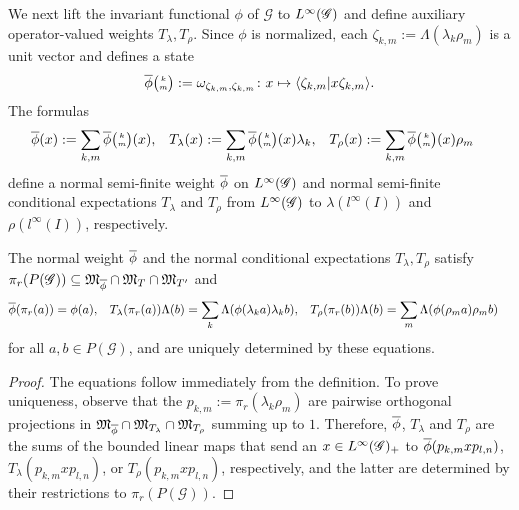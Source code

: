  We next lift the invariant functional $\phi$ of $\mathscr{G}$ to
$L^{\infty}(\mathscr{G})$ and define auxiliary operator-valued weights
$T_{\lambda},T_{\rho}$.
Since $\phi$
is normalized,   each
$\zeta_{k,m}:=\Lambda(\lambda_{k}\rho_{m})$ is a unit vector and
defines a state
\begin{align*}
  \overline{\phi}{\tiny {\begin{pmatrix} k\\m\end{pmatrix}}} := \omega_{\zeta_{k,m},\zeta_{k,m}} \colon x \mapsto \langle \zeta_{k,m}|x\zeta_{k,m}\rangle.
\end{align*}
 The formulas
\begin{align} \label{eq:vn-weights}
  \overline{\phi}(x) &:= \sum_{k,m} \overline{\phi}{\tiny {\begin{pmatrix} k\\m\end{pmatrix}}}(x), &
    T_{\lambda}(x)&:= \sum_{k,m}
\overline{\phi}{\tiny {\begin{pmatrix} k\\m\end{pmatrix}}}(x)\lambda_{k}, & 
T_{\rho}(x)&:=
    \sum_{k,m} \overline{\phi}{\tiny {\begin{pmatrix} k\\m\end{pmatrix}}}(x)\rho_{m}
\end{align}
define  a normal semi-finite weight $\overline{\phi}$
on $L^{\infty}(\mathscr{G})$ and normal semi-finite conditional expectations $T_{\lambda}$ and
$T_{\rho}$ from $L^{\infty}(\mathscr{G})$ to $\lambda(l^{\infty}(I))$ and
$\rho(l^{\infty}(I))$, respectively. 
\begin{Lem} \label{lemma:vn-weights-unique} The normal weight $\overline{\phi}$ and
  the normal conditional expectations $T_{\lambda},T_{\rho}$ satisfy $\pi_{r}(P(\mathscr{G})) \subseteq
  \mathfrak{M}_{\overline{\phi}} \cap \mathfrak{M}_{T} \cap \mathfrak{M}_{T'}$
  and
  \begin{align*}
    \overline{\phi}(\pi_{r}(a))&= \phi(a), & T_{\lambda}(\pi_{r}(a))\Lambda(b) &=
    \sum_{k}\Lambda(\phi(\lambda_{k}a)\lambda_{k}b), &
    T_{\rho}(\pi_{r}(b))\Lambda(b) &= \sum_{m}\Lambda(\phi(\rho_{m}a)\rho_{m}b)
  \end{align*}
  for all $a,b\in P(\mathscr{G})$, and are uniquely determined by these equations. 
\end{Lem}
\begin{proof}
  The equations follow immediately from the definition. To prove
  uniqueness, observe that the $p_{k,m}:=\pi_{r}(\lambda_{k}\rho_{m})$ are
  pairwise orthogonal projections in $\mathfrak{M}_{\overline{\phi}}
  \cap \mathfrak{M}_{T_{\lambda}} \cap \mathfrak{M}_{T_{\rho}}$
  summing up to $1$. Therefore, $\overline{\phi}$, $T_{\lambda}$ and $T_{\rho}$ are
  the sums of the bounded linear maps that send an $x\in L^{\infty}(\mathscr{G})_{+}$
  to $\overline{\phi}(p_{k,m}xp_{l,n})$, $T_{\lambda}(p_{k,m}xp_{l,n})$, or
  $T_{\rho}(p_{k,m}xp_{l,n})$, respectively, and the latter are determined by
  their restrictions to $\pi_{r}(P(\mathscr{G}))$.
\end{proof}

